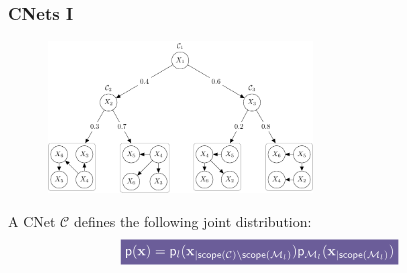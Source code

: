 \documentclass[xcolor={usenames,dvipsnames,svgnames}, compress]{beamer}
\newcommand{\highlight}[2][yellow]{\mathchoice%
  {\colorbox{#1}{\strut\textcolor{white}{$\displaystyle{#2}$}}}%
  {\colorbox{#1}{\strut\textcolor{white}{$\textstyle{#2}$}}}%
  {\colorbox{#1}{\strut\textcolor{white}{$\scriptstyle{#2}$}}}%
  {\colorbox{#1}{\strut\textcolor{white}{$\scriptscriptstyle{#2}$}}}}%
\begin{document}
\begin{frame}[t]
  \frametitle{CNets I}
  \small
  \begin{figure}
     \centering
     \includegraphics[width=7cm]{figures/csn}
  \label{fig:csn}
\end{figure}
  A CNet $\mathcal{C}$ defines the following joint distribution:
  \begin{equation*}
\highlight[lacamlilac]{\mathsf{p}(\mathbf{x}) = \mathsf{p}_l(\mathbf
x_{|\mathsf{scope}(\mathcal C)\setminus \mathsf{scope}(\mathcal
  M_l)})\mathsf{p}_{\mathcal M_l}(\mathbf x_{| \mathsf{scope}(\mathcal
  M_l)})}\label{eq:cnetdistr}
\end{equation*}
    
  \end{frame}
\end{document}
